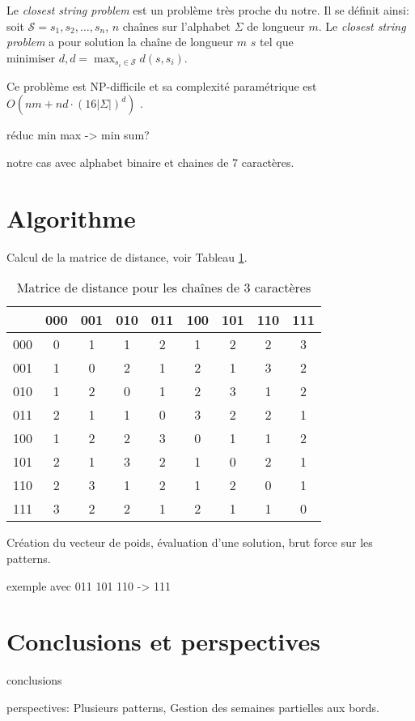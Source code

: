 \documentclass{roadef}
\begin{document}
Le \emph{closest string problem} est un problème très proche du notre.
Il se définit ainsi: soit $\mathcal{S} = s_1, s_2, \ldots, s_n$, $n$
chaînes sur l'alphabet $\Sigma$ de longueur $m$.  Le \emph{closest
  string problem} a pour solution la chaîne de longueur $m$ $s$ tel
que
\begin{math}
  \textrm{minimiser } d, d = \max_{s_i\in\mathcal{S}} d(s, s_i)
\end{math}.

Ce problème est NP-difficile \cite{lanctot2003distinguishing} et sa
complexité paramétrique est
\begin{math}
  O(nm + nd\cdot(16|\Sigma|)^d)
\end{math}
\cite{ma2008more}.

réduc min max -> min sum?

notre cas avec alphabet binaire et chaines de 7 caractères.

\section{Algorithme}

Calcul de la matrice de distance, voir Tableau \ref{matrice-distances}.

\begin{table}[!ht]
  \begin{center}
    \begin{tabular}{|c|cccccccc|}
      \hline
      & 000 & 001 & 010 & 011 & 100 & 101 & 110 & 111\\
      \hline
      000 & 0 & 1 &   1 &   2 &   1 &   2 &   2 &   3\\
      001 & 1 & 0 &   2 &   1 &   2 &   1 &   3 &   2\\
      010 & 1 & 2 &   0 &   1 &   2 &   3 &   1 &   2\\
      011 & 2 & 1 &   1 &   0 &   3 &   2 &   2 &   1\\
      100 & 1 & 2 &   2 &   3 &   0 &   1 &   1 &   2\\
      101 & 2 & 1 &   3 &   2 &   1 &   0 &   2 &   1\\
      110 & 2 & 3 &   1 &   2 &   1 &   2 &   0 &   1\\
      111 & 3 & 2 &   2 &   1 &   2 &   1 &   1 &   0\\
      \hline
    \end{tabular}
    \caption{Matrice de distance pour les chaînes de 3 caractères}
    \label{matrice-distances}
  \end{center}
\end{table}

Création du vecteur de poids, évaluation d'une solution, brut force sur
les patterns.

exemple avec 011 101 110 -> 111

\section{Conclusions et perspectives}

conclusions

perspectives: Plusieurs patterns, Gestion des semaines partielles aux
bords.



\end{document}

